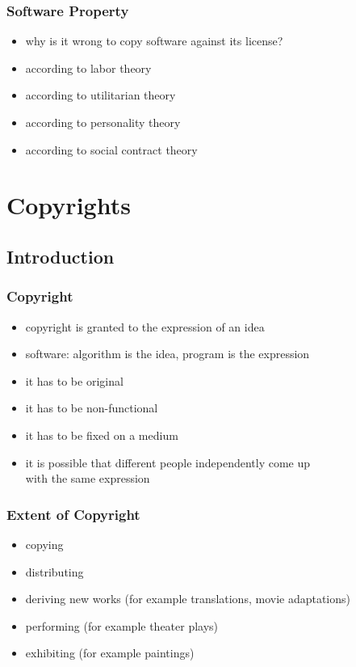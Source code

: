 \documentclass[dvipsnames]{beamer}
\theoremstyle{plain}
\begin{document}
\begin{frame}
  \frametitle{Software Property}

  \begin{itemize}
    \item why is it wrong to copy software against its license?

    \pause
    \medskip
    \item according to labor theory

    \pause
    \item according to utilitarian theory

    \pause
    \item according to personality theory

    \pause
    \item according to social contract theory
  \end{itemize}
\end{frame}

\section{Copyrights}

\subsection{Introduction}

\begin{frame}
  \frametitle{Copyright}

  \begin{itemize}
    \item copyright is granted to the \alert{expression} of an idea
    \item software: algorithm is the idea, program is the expression

    \pause
    \medskip
    \item it has to be original
    \item it has to be non-functional
    \item it has to be fixed on a medium

    \pause
    \medskip
    \item it is possible that different people independently come up\\
      with the same expression
  \end{itemize}
\end{frame}

\begin{frame}
  \frametitle{Extent of Copyright}

  \begin{itemize}
    \item copying
    \item distributing
    \item deriving new works (for example translations, movie adaptations)
    \item performing (for example theater plays)
    \item exhibiting (for example paintings)
  \end{itemize}
\end{frame}
\end{document}
